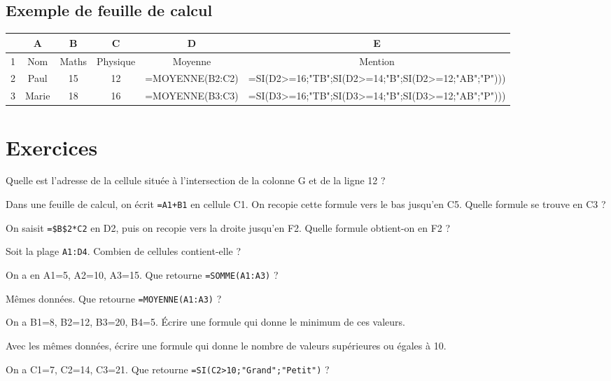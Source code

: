 \subsection{Exemple de feuille de calcul}
\begin{center}
\begin{tabular}{|c|c|c|c|c|c|}
\hline
 & \textbf{A} & \textbf{B} & \textbf{C} & \textbf{D} & \textbf{E} \\ \hline
1 & Nom & Maths & Physique & Moyenne & Mention \\ \hline
2 & Paul & 15 & 12 & =MOYENNE(B2:C2) & =SI(D2>=16;"TB";SI(D2>=14;"B";SI(D2>=12;"AB";"P"))) \\ \hline
3 & Marie & 18 & 16 & =MOYENNE(B3:C3) & =SI(D3>=16;"TB";SI(D3>=14;"B";SI(D3>=12;"AB";"P"))) \\ \hline
\end{tabular}
\end{center}

\section{Exercices}


\exo{}
Quelle est l'adresse de la cellule située à l'intersection de la colonne G et de la ligne 12 ?

\exo{}
Dans une feuille de calcul, on écrit \texttt{=A1+B1} en cellule C1. On recopie cette formule vers le bas jusqu'en C5. Quelle formule se trouve en C3 ?

\exo{}
On saisit \texttt{=\$B\$2*C2} en D2, puis on recopie vers la droite jusqu'en F2. Quelle formule obtient-on en F2 ?

\exo{}
Soit la plage \texttt{A1:D4}. Combien de cellules contient-elle ?


\exo{}
On a en A1=5, A2=10, A3=15. Que retourne \texttt{=SOMME(A1:A3)} ?

\exo{}
Mêmes données. Que retourne \texttt{=MOYENNE(A1:A3)} ?

\exo{}
On a B1=8, B2=12, B3=20, B4=5. Écrire une formule qui donne le minimum de ces valeurs.

\exo{}
Avec les mêmes données, écrire une formule qui donne le nombre de valeurs supérieures ou égales à 10.

\exo{}
On a C1=7, C2=14, C3=21. Que retourne \texttt{=SI(C2>10;"Grand";"Petit")} ?

